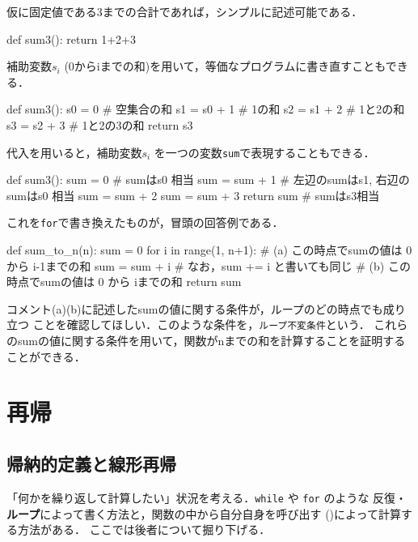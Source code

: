 仮に固定値である3までの合計であれば，シンプルに記述可能である．
\begin{pybox}
def sum3():
    return 1+2+3
\end{pybox}
補助変数$s_i$ (0からiまでの和)を用いて，等価なプログラムに書き直すこともできる．
\begin{pybox}
def sum3():
    s0 = 0 # 空集合の和
    s1 = s0 + 1 # 1の和
    s2 = s1 + 2 # 1と2の和
    s3 = s2 + 3 # 1と2の3の和
    return s3
\end{pybox}

代入を用いると，補助変数$s_i$ を一つの変数\texttt{sum}で表現することもできる．
\begin{pybox}
def sum3():
    sum = 0 # sumはs0 相当
    sum = sum + 1 # 左辺のsumはs1, 右辺のsumはs0 相当
    sum = sum + 2
    sum = sum + 3
    return sum # sumはs3相当
\end{pybox}
これを\texttt{for}で書き換えたものが，冒頭の回答例である．

\begin{pybox}[emph=sum]
def sum_to_n(n):
    sum = 0
    for i in range(1, n+1):
        # (a) この時点でsumの値は 0 から i-1までの和
        sum = sum + i  # なお，sum += i と書いても同じ
        # (b) この時点でsumの値は 0 から iまでの和
    return sum
\end{pybox}
コメント(a)(b)に記述したsumの値に関する条件が，ループのどの時点でも成り立つ
ことを確認してほしい．このような条件を，\texttt{ループ不変条件}という．
これらのsumの値に関する条件を用いて，関数がnまでの和を計算することを証明することができる．

\section{再帰}\label{section:recursion}

\subsection{帰納的定義と線形再帰}\label{section:linear}

「何かを繰り返して計算したい」状況を考える．\texttt{while} や \texttt{for} のような
反復・\textbf{ループ}によって書く方法と，関数の中から自分自身を呼び出す ()によって計算する方法がある．
ここでは後者について掘り下げる．

